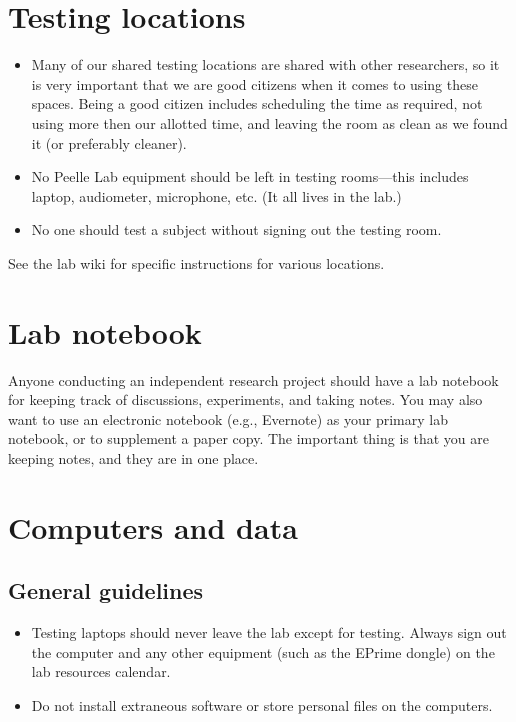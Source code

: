 \documentclass[letterpaper,12pt,oneside]{memoir}
\begin{document}
\section{Testing locations}
\label{sec:testing_locations}

\begin{itemize}
\item Many of our shared testing locations are shared with other researchers, so it is very important that we are good citizens when it comes to using these spaces. Being a good citizen includes scheduling the time as required, not using more then our allotted time, and leaving the room as clean as we found it (or preferably cleaner).
\item No Peelle Lab equipment should be left in testing rooms---this includes laptop, audiometer, microphone, etc. (It all lives in the lab.)
\item No one should test a subject without signing out the testing room.
\end{itemize}

 See the lab wiki for specific instructions for various locations.



\section{Lab notebook}
\label{sec:lab_notebook}

Anyone conducting an independent research project should have a lab notebook for keeping track of discussions, experiments, and taking notes. You may also want to use an electronic notebook (e.g., Evernote) as your primary lab notebook, or to supplement a paper copy. The important thing is that you are keeping notes, and they are in one place.

\section{Computers and data}

\subsection{General guidelines}

\begin{itemize}
\item Testing laptops should never leave the lab except for testing. Always sign out the computer and any other equipment (such as the EPrime dongle) on the lab resources calendar.
\item Do not install extraneous software or store personal files on the computers.
\end{itemize}
\end{document}
